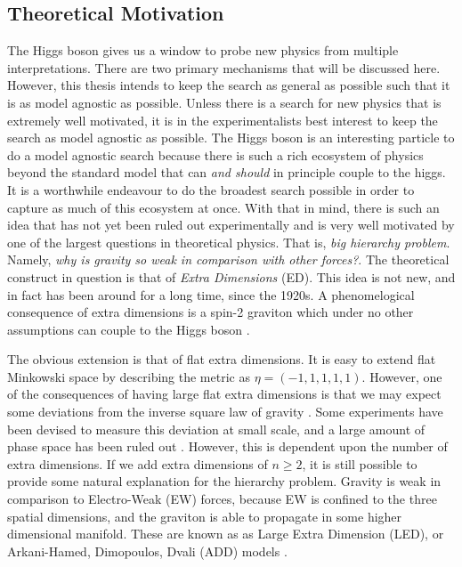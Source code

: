 \documentclass[12pt]{article}
\begin{document}
\subsection{Theoretical Motivation}
The Higgs boson gives us a window to probe new physics from multiple
interpretations. There are two primary mechanisms that will be discussed here.
However, this thesis intends to keep the search as general as possible such that
it is as model agnostic as possible. Unless there is a search for new physics
that is extremely well motivated, it is in the experimentalists best interest to
keep the search as model agnostic as possible. The Higgs boson is an interesting
particle to do a model agnostic search because there is such a rich ecosystem of
physics beyond the standard model that can \textit{and should} in principle
couple to the higgs. It is a worthwhile endeavour to do the broadest search
possible in order to capture as much of this ecosystem at once. With that in
mind, there is such an idea that has not yet been ruled out experimentally and
is very well motivated by one of the largest questions in theoretical physics.
That is, \textit{big hierarchy problem}. Namely, \textit{why is gravity so weak
in comparison with other forces?}. The theoretical construct in question is that
of \textit{Extra Dimensions} (ED). This idea is not new, and in fact has been
around for a long time, since the 1920s. A phenomelogical consequence of extra
dimensions is a spin-2 graviton which under no other assumptions can couple to
the Higgs boson \cite{bsm}.  

The obvious extension is that of flat extra dimensions. It is easy to extend
flat Minkowski space by describing the metric as $\eta = (-1,1,1,1,1)$. However,
one of the consequences of having large flat extra dimensions is that we may
expect some deviations from the inverse square law of gravity \cite{bsm}. Some
experiments have been devised to measure this deviation at small scale, and a
large amount of phase space has been ruled out \cite{bsm}. However, this is
dependent upon the number of extra dimensions. If we add extra dimensions of
$n\geq 2$, it is still possible to provide some natural explanation for the
hierarchy problem. Gravity is weak in comparison to Electro-Weak (EW) forces,
because EW is confined to the three spatial dimensions, and the graviton is able
to propagate in some higher dimensional manifold. These are known as as Large
Extra Dimension (LED), or Arkani-Hamed, Dimopoulos, Dvali (ADD) models
\cite{Arkani_Hamed_1998, Arkani_Hamed_1999}. 
\end{document}
